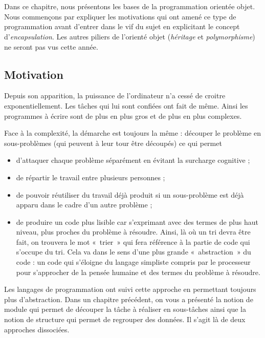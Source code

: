 \chapter[L'orienté objet]{}
{
Dans ce chapitre, nous présentons les bases de la programmation orientée
objet. Nous commençons par expliquer les motivations qui ont amené ce
type de programmation avant d'entrer dans le vif du
sujet en explicitant le concept
d'\textit{encapsulation}. Les autres piliers de
l'orienté objet (\textit{héritage} et
\textit{polymorphisme}) ne seront pas vus cette année.}

\section{Motivation}
{
Depuis son apparition, la puissance de l'ordinateur
n'a cessé de croitre exponentiellement. Les tâches qui
lui sont confiées ont fait de même. Ainsi les programmes à écrire sont
de plus en plus gros et de plus en plus complexes.}

{
Face à la complexité, la démarche est toujours la même : découper le
problème en sous-problèmes (qui peuvent à leur tour être découpés) ce
qui permet}

\liststyleListv
\begin{itemize}
\item {
d'attaquer chaque problème séparément en évitant la
surcharge cognitive ;}
\item {
de répartir le travail entre plusieurs personnes ;}
\item {
de pouvoir réutiliser du travail déjà produit si un sous-problème est
déjà apparu dans le cadre d'un autre problème ;}
\item {
de produire un code plus lisible car s'exprimant avec
des termes de plus haut niveau, plus proches du problème à résoudre.
Ainsi, là où un tri devra être fait, on trouvera le mot «~trier~» qui
fera référence à la partie de code qui s’occupe du tri. Cela va dans le
sens d’une plus grande «~abstraction~» du code : un code qui s’éloigne
du langage simpliste compris par le processeur pour s’approcher de la
pensée humaine et des termes du problème à résoudre.}
\end{itemize}
{
Les langages de programmation ont suivi cette approche en permettant
toujours plus d’abstraction. Dans un chapitre précédent, on vous a
présenté la notion de module qui permet de découper la tâche à réaliser
en sous-tâches ainsi que la notion de structure qui permet de regrouper
des données. Il s'agit là de deux approches
dissociées. }

